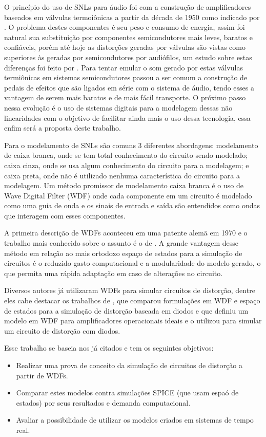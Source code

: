 O princípio do uso de SNLs para áudio foi com a construção de amplificadores baseados em válvulas termoiônicas a partir da década de 1950 como indicado por . O problema destes componentes é seu peso e consumo de energia, assim foi natural sua substituição por componentes semicondutores mais leves, baratos e confiáveis, porém até hoje as distorções geradas por válvulas são vistas como superiores às geradas por semicondutores por audiófilos, um estudo sobre estas diferenças foi feito por . Para tentar emular o som gerado por estas válvulas termiônicas em sistemas semicondutores passou a ser comum a construção de pedais de efeitos que são ligados em série com o sistema de áudio, tendo esses a vantagem de serem mais baratos e de mais fácil transporte. O próximo passo nessa evolução é o uso de sistemas digitais para a modelagem dessas não linearidades com o objetivo de facilitar ainda mais o uso dessa tecnologia, essa enfim será a proposta deste trabalho.

Para o modelamento de SNLs são comuns 3 diferentes abordagens: modelamento de caixa branca, onde se tem total conhecimento do circuito sendo modelado; caixa cinza, onde se usa algum conhecimento do circuito para a modelagem; e caixa preta, onde não é utilizado nenhuma característica do circuito para a modelagem. Um método promissor de modelamento caixa branca é o uso de Wave Digital Filter (WDF) onde cada componente em um circuito é modelado como uma guia de onda e os sinais de entrada e saída são entendidos como ondas que interagem com esses componentes.

A primeira descrição de WDFs aconteceu em uma patente alemã em 1970 e o trabalho mais conhecido sobre o assunto é o de . A grande vantagem desse método em relação ao mais ortodoxo espaço de estados para a simulação de circuitos é o reduzido gasto computacional e a modularidade do modelo gerado, o que permita uma rápida adaptação em caso de alterações no circuito.
 
Diversos autores já utilizaram WDFs para simular circuitos de distorção, dentre eles cabe destacar os trabalhos de , que comparou formulações em WDF e espaço de estados para a simulação de distorção baseada em diodos e  que definiu um modelo em WDF para amplificadores operacionais ideais e o utilizou para simular um circuito de distorção com diodos.

Esse trabalho se baseia nos já citados e tem os seguintes objetivos:
\begin{itemize}
	\item Realizar uma prova de conceito da simulação de circuitos de distorção a partir de WDFs.
	\item Comparar estes modelos contra simulações SPICE (que usam espaó de estados) por seus resultados e demanda computacional.
	\item Avaliar a possibilidade de utilizar os modelos criados em sistemas de tempo real.
\end{itemize}

